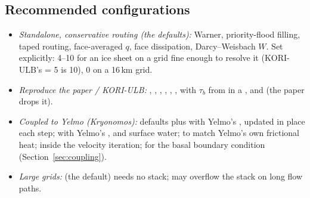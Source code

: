 \subsection{Recommended configurations}\label{opt:recommended}
\begin{itemize}[leftmargin=1.5em]
\item \emph{Standalone, conservative routing (the defaults):} Warner, priority-flood filling, taped routing, face-averaged $q$, face
  dissipation, Darcy--Weisbach $W$. Set  explicitly: 4--10 for an ice sheet on a grid fine enough to resolve it (KORI-ULB's  = 5 is 10), 0 on a 16\,km grid.
\item \emph{Reproduce the paper / KORI-ULB:} , , ,
  , , , with $\tau_b$ from
   in a , and  (the paper drops it).
\item \emph{Coupled to Yelmo (Kryonomos):} defaults plus  with Yelmo's , updated in place each
  step;  with Yelmo's ,  and surface water;  to match Yelmo's own
  frictional heat;  inside the velocity iteration;  for the basal boundary condition
  (Section~\ref{sec:coupling}).
\item \emph{Large grids:}  (the default) needs no stack;  may overflow the stack on long flow
  paths.
\end{itemize}
